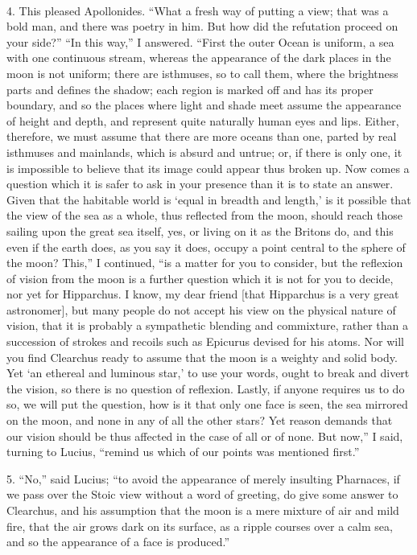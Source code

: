 \documentclass[a4paper, 11pt, oneside, polutonikogreek, english]{article}
\begin{document}
\paragraph{}
4. This pleased Apollonides. ``What a fresh way of putting a view; that was a bold man, and there was poetry in him. But how did the refutation proceed on your side?'' ``In this way,'' I answered. ``First the outer Ocean is uniform, a sea with one continuous stream, whereas the appearance of the dark places in the moon is not uniform; there are isthmuses, so to call them, where the brightness parts and defines the shadow; each region is marked off and has its proper boundary, and so the places where light and shade meet assume the appearance of height and depth, and represent quite naturally human eyes and lips. Either, therefore, we must assume that there are more oceans than one, parted by real isthmuses and mainlands, which is absurd and untrue; or, if there is only one, it is impossible to believe that its image could appear thus broken up. Now comes a question which it is safer to ask in your presence than it is to state an answer. Given that the habitable world is `equal in breadth and length,' is it possible that the view of the sea as a whole, thus reflected from the moon, should reach those sailing upon the great sea itself, yes, or living on it as the Britons do, and this even if the earth does, as you say it does, occupy a point central to the sphere of the moon? This,'' I continued, ``is a matter for you to consider, but the reflexion of vision from the moon is a further question which it is not for you to decide, nor yet for Hipparchus. I know, my dear friend [that Hipparchus is a very great astronomer], but many people do not accept his view on the physical nature of vision, that it is probably a sympathetic blending and commixture, rather than a succession of strokes and recoils such as Epicurus devised for his atoms. Nor will you find Clearchus ready to assume that the moon is a weighty and solid body. Yet `an ethereal and luminous star,' to use your words, ought to break and divert the vision, so there is no question of reflexion. Lastly, if anyone requires us to do so, we will put the question, how is it that only one face is seen, the sea mirrored on the moon, and none in any of all the other stars? Yet reason demands that our vision should be thus affected in the case of all or of none. But now,'' I said, turning to Lucius, ``remind us which of our points was mentioned first.''

5. ``No,'' said Lucius; ``to avoid the appearance of merely insulting Pharnaces, if we pass over the Stoic view without a word of greeting, do give some answer to Clearchus, and his assumption that the moon is a mere mixture of air and mild fire, that the air grows dark on its surface, as a ripple courses over a calm sea, and so the appearance of a face is produced.''
\end{document}
